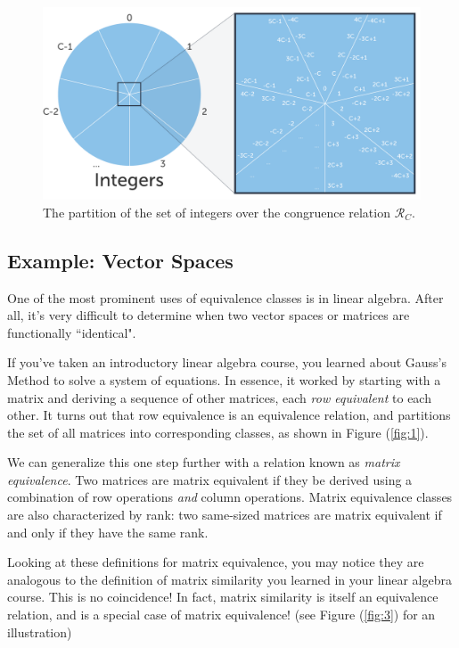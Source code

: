 \documentclass{article}
\begin{document}
        \begin{figure}[htbp]
            \centering
            \includegraphics[scale = .4]{sp23/hw-supplements/hw5-supp/images/congruence_classes.png}
            \caption{The partition of the set of integers over the congruence relation $\mathcal{R}_{C}$.}
            \label{fig:congruency_classes}
        \end{figure}
        


    \subsection*{Example: Vector Spaces}
        One of the most prominent uses of equivalence classes is in linear algebra. After all, it's very difficult to determine when two vector spaces or matrices are functionally ``identical". 

        \vspace{3mm}
        If you've taken an introductory linear algebra course, you learned about Gauss's Method to solve a system of equations. In essence, it worked by starting with a matrix and deriving a sequence of other matrices, each \textit{row equivalent} to each other. It turns out that row equivalence is an equivalence relation, and partitions the set of all matrices into corresponding classes, as shown in Figure (\ref{fig:1}).

        \vspace{3mm}
        We can generalize this one step further with a relation known as \textit{matrix equivalence}. Two matrices are matrix equivalent if they be derived using a combination of row operations \textit{and} column operations. Matrix equivalence classes are also characterized by rank: two same-sized matrices are matrix equivalent if and only if they have the same rank.
        
        \vspace{2mm}
        Looking at these definitions for matrix equivalence, you may notice they are analogous to the definition of matrix similarity you learned in your linear algebra course. This is no coincidence! In fact, matrix similarity is itself an equivalence relation, and is a special case of matrix equivalence! (see Figure (\ref*{fig:3}) for an illustration)
\end{document}
